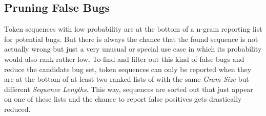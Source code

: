 \subsection{Pruning False Bugs}\label{subsec:false_bugs}
Token sequences with low probability are at the bottom of a n-gram reporting list for potential bugs. But there is always the chance that the found sequence is not actually wrong but just a very unusual or special use case in which its probability would also rank rather low. To find and filter out this kind of false bugs and reduce the candidate bug set, token sequences can only be reported when they are at the bottom of at least two ranked lists of  with the same \emph{Gram Size} but different \emph{Sequence Lengths}. This way, sequences are sorted out that just appear on one of these lists and the chance to report false positives gets drastically reduced. 